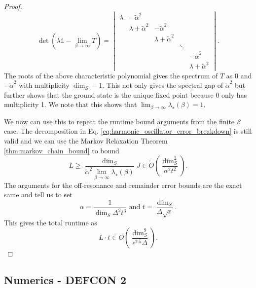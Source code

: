 \documentclass{article}
\newcommand{\bigotilde}[1]{\widetilde{O} \left( #1 \right)}
\newcommand{\identity}{\mathds{1}}
\begin{document}
\begin{proof}
\begin{equation}
    \det \left(\lambda \identity - \lim_{\beta \to \infty} T \right) =  \begin{vmatrix}
        \lambda & -\widetilde{\alpha}^2 &   &\\
        & \lambda + \widetilde{\alpha}^2 & -\widetilde{\alpha}^2 &  &\\
        & & \lambda + \widetilde{\alpha}^2  & & \\
        & & & \ddots & \\
        & &     &       & -\widetilde{\alpha}^2 \\
        & &  & & \lambda + \widetilde{\alpha}^2
    \end{vmatrix}.
\end{equation}
    The roots of the above characteristic polynomial gives the spectrum of $T$ as 0 and $-\widetilde{\alpha}^2$ with multiplicity $\dim_S - 1$. This not only gives the spectral gap of $\widetilde{\alpha}^2$ but further shows that the ground state is the unique fixed point because 0 only has multiplicity 1. We note that this shows that $\lim_{\beta \to \infty} \lambda_\star(\beta) = 1$.

    We now can use this to repeat the runtime bound arguments from the finite $\beta$ case. The decomposition in Eq. \eqref{eq:harmonic_oscillator_error_breakdown} is still valid and we can use the Markov Relaxation Theorem \ref{thm:markov_chain_bound} to bound
    \begin{equation}
        L \ge \frac{\dim_S}{\widetilde{\alpha}^2\lim_{\beta \to \infty} \lambda_\star(\beta)} J \in \bigotilde{\frac{\dim_S^2}{\alpha^2 t^2}}.
    \end{equation}
    The arguments for the off-resonance and remainder error bounds are the exact same and tell us to set
    \begin{equation}
        \alpha = \frac{1}{\dim_S \Delta^2 t^3} \text{ and } t = \frac{\dim_S}{\Delta \sqrt{\epsilon}}.
    \end{equation}
    This gives the total runtime as
    \begin{equation}
        L\cdot t \in \bigotilde{\frac{\dim_S^9}{\epsilon^{2.5} \Delta}}.
    \end{equation}
\end{proof}



\subsection{Numerics - DEFCON 2}
\end{document}
